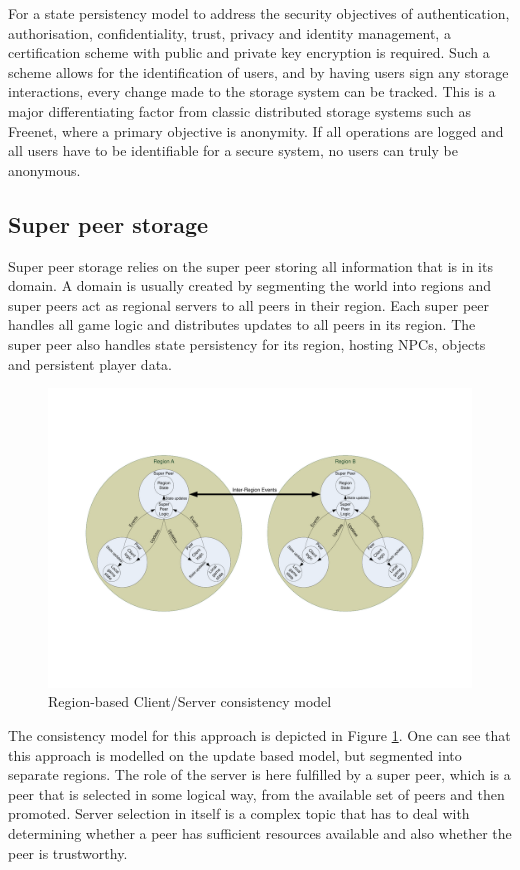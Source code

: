 \documentclass[10pt,a4paper,journal,cspaper,compsoc]{IEEEtran}
\begin{document}
For a state persistency model to address the security objectives of authentication, authorisation, confidentiality, trust, privacy and identity
management, a certification scheme with public and private key encryption is required. Such a scheme allows for the identification of users, and by
having users sign any storage interactions, every change made to the storage system can be tracked. This is a major differentiating factor from
classic distributed storage systems such as Freenet, where a primary objective is anonymity. If all operations are logged and all users have to be
identifiable for a secure system, no users can truly be anonymous.

\subsection{Super peer storage}
\label{super_peer_storage}

Super peer storage relies on the super peer storing all information that is in its domain. A domain is usually created by segmenting the world into
regions and super peers act as regional servers to all peers in their region. Each super peer handles all game logic and distributes updates to all
peers in its region. The super peer also handles state persistency for its region, hosting NPCs, objects and persistent player data.

\begin{figure}[htbp]
 \centering
 \includegraphics[clip=true, viewport=2cm 5cm 27cm 16.5cm, width=\textwidth]{region_based_CS_CM}
 \caption{Region-based Client/Server consistency model}
 \label{fig_cs_region_cm}
\end{figure}
%
The consistency model for this approach is depicted in Figure \ref{fig_cs_region_cm}. One can see that this approach is modelled on the update based
model, but segmented into separate regions. The role of the server is here fulfilled by a super peer, which is a peer that is selected in some
logical way, from the available set of peers and then promoted. Server selection in itself is a complex topic that has to deal with determining
whether a peer has sufficient resources available and also whether the peer is trustworthy.
\end{document}
